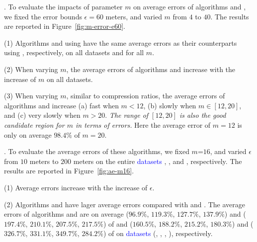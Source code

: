 .
To evaluate the impacts of parameter $m$ on average errors of algorithms \cist and \cista, we fixed the error bounds {$\epsilon =60$ meters}, and varied $m$ from $4$ to $40$. The results are reported in Figure~\ref{fig:m-error-e60}.



\ni(1) Algorithms \cist and \cista using \rpia have the same average errors as their counterparts using \cpia, respectively, on all datasets and for all $m$.

\ni(2) When varying $m$, the average errors of algorithms \cist and \cista increase with the increase of $m$ on all datasets.

\ni(3) When varying $m$, similar to compression ratios, the average errors of algorithms \cist and \cista increase (a) fast when $m < 12$, (b) slowly when $m \in [12, 20]$, and (c) very slowly when $m > 20$. \emph{The range of $[12, 20]$ is also the good candidate region for $m$ in terms of errors.} Here the average error of $m=12$ is only on average {$98.4\%$} of $m=20$.




.
To evaluate the average errors of these algorithms, we fixed {$m$=$16$}, and varied $\epsilon$ from $10$ meters to $200$ meters on the entire \textcolor{blue}{datasets} \truck, \sercar, \geolife and \pricar, respectively.
The results are reported in Figure~\ref{fig:ae-m16}.

\ni(1) Average errors increase with the increase of $\epsilon$.

\ni(2) Algorithms \cist and \cista have lager average errors compared with \dps and \squishe.
The average errors of algorithms \cist and \cista are on average ($96.9\%$, $119.3\%$, $127.7\%$, $137.9\%$) and ($197.4\%$, $210.1\%$, $207.5\%$, $217.5\%$) of \dps and ($160.5\%$, $188.2\%$, $215.2\%$, {$180.3\%$}) and ($326.7\%$, $331.1\%$, $349.7\%$, {$284.2\%$}) of \squishe on \textcolor{blue}{datasets} (\truck, \sercar, \geolife, \pricar), respectively.

